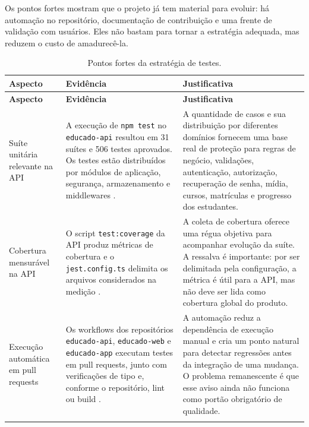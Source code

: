 Os pontos fortes mostram que o projeto já tem material para evoluir: há
automação no repositório, documentação de contribuição e uma frente de validação
com usuários. Eles não bastam para tornar a estratégia adequada, mas reduzem o
custo de amadurecê-la.

{\footnotesize
\begin{longtable}{>{\raggedright\arraybackslash}p{2.9cm} >{\raggedright\arraybackslash}p{5.1cm} >{\raggedright\arraybackslash}p{5.1cm}}
\caption{Pontos fortes da estratégia de testes.}
\label{tab:pontosfortes}\\
\toprule
\textbf{Aspecto} & \textbf{Evidência} & \textbf{Justificativa} \\
\midrule
\endfirsthead

\toprule
\textbf{Aspecto} & \textbf{Evidência} & \textbf{Justificativa} \\
\midrule
\endhead

Suíte unitária relevante na API
&
A execução de \texttt{npm test} no \texttt{educado-api} resultou em 31 suítes e
506 testes aprovados. Os testes estão distribuídos por módulos de aplicação,
segurança, armazenamento e middlewares \cite{educado-repos}.
&
A quantidade de casos e sua distribuição por diferentes domínios fornecem uma
base real de proteção para regras de negócio, validações, autenticação,
autorização, recuperação de senha, mídia, cursos, matrículas e progresso dos
estudantes.
\\
\addlinespace

Cobertura mensurável na API
&
O script \texttt{test:coverage} da API produz métricas de cobertura e o
\texttt{jest.config.ts} delimita os arquivos considerados na medição
\cite{educado-repos}.
&
A coleta de cobertura oferece uma régua objetiva para acompanhar evolução da
suíte. A ressalva é importante: por ser delimitada pela configuração, a métrica
é útil para a API, mas não deve ser lida como cobertura global do produto.
\\
\addlinespace

Execução automática em pull requests
&
Os workflows dos repositórios \texttt{educado-api}, \texttt{educado-web} e
\texttt{educado-app} executam testes em pull requests, junto com verificações de
tipo e, conforme o repositório, lint ou build \cite{educado-repos}.
&
A automação reduz a dependência de execução manual e cria um ponto natural para
detectar regressões antes da integração de uma mudança. O problema remanescente
é que esse aviso ainda não funciona como portão obrigatório de qualidade.
\\
\addlinespace


\end{longtable}}
